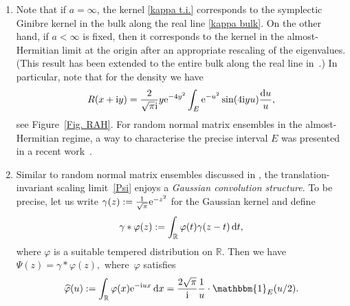 \documentclass[pdftex]{sigma}
\numberwithin{equation}{section}
\newcommand{\R}{{\mathbb R}}
\newcommand{\1}{\chi}
\def\wh{\widehat}
\begin{document}
\begin{Remark} \noindent
	\begin{enumerate}\itemsep=0pt
\item[(i)] Note that if $a=\infty$, the kernel \eqref{kappa t.i.} corresponds to the symplectic Ginibre kernel in the bulk along the real line \eqref{kappa bulk}.
		On the other hand, if $a<\infty$ is fixed, then it corresponds to the kernel in the almost-Hermitian limit at the origin \cite{MR1928853} after an appropriate rescaling of the eigenvalues.
		(This result has been extended to the entire bulk along the real line in~\cite{byun2021wronskian}.)
		In particular, note that for the density we have
		\begin{gather} \label{R AH}
		R(x+{\rm i}y)=\frac{2}{\sqrt{\pi} {\rm i}} y {\rm e}^{-4y^2} \int_E {\rm e}^{-u^2} \sin(4{\rm i}y u) \frac{{\rm d}u}{u},
		\end{gather}
		see Figure~\ref{Fig. RAH}.
		For random normal matrix ensembles in the almost-Hermitian regime, a way to characterise the precise interval $E$ was presented in a recent work~\cite{AB21}. 	
\item[(ii)] 	Similar to random normal matrix ensembles discussed in \cite{MR3975882,MR4030288}, the translation-invariant scaling limit~\eqref{Psi} enjoys a \emph{Gaussian convolution structure}.
		To be precise, let us write $\gamma(z):=\frac{1}{\sqrt{\pi}} {\rm e}^{-z^2} $ for the Gaussian kernel and define
		\begin{gather*}
			\gamma * \varphi(z):=\int_\R \varphi(t) \gamma(z-t)\,{\rm d}t,
		\end{gather*}
		where $\varphi$ is a suitable tempered distribution on $\R$.
		Then we have
		$\Psi(z)=	\gamma * \varphi(z),$ where~$\varphi$ satisfies
		\begin{gather*}
			\wh{\varphi}(u):=\int_{\R} \varphi(x) {\rm e}^{-{\rm i}u x}\,{\rm d}x =\frac{2\sqrt{\pi}}{{\rm i}} \frac{1}{u}\cdot \mathbbm{1}_{E}(u/2).
		\end{gather*}
	\end{enumerate}
\end{Remark}
\end{document}
